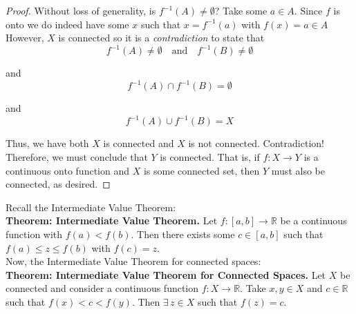 \documentclass[12pt]{article}
\newlength\tindent
\renewcommand{\indent}{\hspace*{\tindent}}
\newcommand{\R}{\mathbb R}
\begin{document}
\begin{proof}
\indent Without loss of generality, is $f^{-1}(A) \neq \emptyset$? Take some $a \in A$. Since $f$ is onto we do indeed have some $x$ such that $x = f^{-1}(a)$ with $f(x) = a \in A$ \\


However, $X$ is connected so it is a {\em contradiction} to state that
\begin{equation*}
	f^{-1}(A) \neq \emptyset \quad \text{and} \quad f^{-1}(B) \neq \emptyset
\end{equation*}

and
\begin{equation*}
	f^{-1}(A) \cap f^{-1}(B) = \emptyset
\end{equation*}

and
\begin{equation*}
	f^{-1}(A) \cup f^{-1}(B) = X
\end{equation*}

\indent Thus, we have both $X$ is connected and $X$ is not connected. Contradiction! Therefore, we must conclude that $Y$ is connected. That is, if $f:X\to Y$ is a continuous onto function and $X$ is some connected set, then $Y$ must also be connected, as desired.
\end{proof}

Recall the Intermediate Value Theorem: \\

%
%
{\bf Theorem: Intermediate Value Theorem.} Let $f:[a,b]\to\R$ be a continuous function with $f(a) < f(b)$. Then there exists some $c \in [a,b]$ such that $f(a) \leq z \leq f(b)$ with $f(c) = z$. \\

Now, the Intermediate Value Theorem for connected spaces: \\

%
%
{\bf Theorem: Intermediate Value Theorem for Connected Spaces.} Let $X$ be connected and consider a continuous function $f:X\to\R$. Take $x,y \in X$ and $c \in \R$ such that $f(x) < c < f(y)$. Then $\exists\,z \in X$ such that $f(z) = c$.
\end{document}

